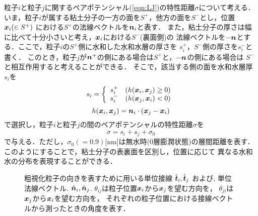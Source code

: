 粒子$i$と粒子$j$に関するペアポテンシャル(\ref{eqn:LJ})の特性距離$\sigma$について考える．
いま，粒子$i$が属する粘土分子の一方の面を$S^+$，他方の面を$S^-$とし，位置$\mbox{\boldmath $x$}_i(\in S^+)$
における$S^+$の法線ベクトルを$\mbox{\boldmath $n$}_i$と表す．
また，粘土分子の厚さは幅に比べて十分小さいと考え，$\mbox{\boldmath $x$}_i$における$S^-$(裏面側)の
法線ベクトルを$-\mbox{\boldmath $n$}$とする．ここで，粒子$i$の$S^+$側に水和した水和水層の厚さを
$s_i^+$，$S^-$側の厚さを$s_i^-$と書く．
このとき，粒子$j$が$\mbox{\boldmath $n$}^+$の側にある場合は$S^+$と，$-\mbox{\boldmath $n$}$の側にある場合は
$S^-$と相互作用すると考えることができる．
そこで，該当する側の面を水和水層厚$s_i$を
\begin{equation}
	s_i=\left\{
	\begin{array}{cc}
		s_i^+ & (h(\mbox{\boldmath $x$}_i,\mbox{\boldmath $x$}_j) \ge 0)\\
		s_i^- & (h(\mbox{\boldmath $x$}_j,\mbox{\boldmath $x$}_i) <0)
	\end{array}
	\right.
	\label{eqn:si_switch}
\end{equation}
\begin{equation}
	h(\mbox{\boldmath $x$}_i,\mbox{\boldmath $x$}_j) =\mbox{\boldmath $n$}_i\cdot \left(\mbox{\boldmath $x$}_j-\mbox{\boldmath $x$}_i\right)
	\label{eqn:h_sgn}
\end{equation}
で選択し，粒子$i$と粒子$j$の間のペアポテンシャルの特性距離$\sigma$を
\begin{equation}
	\sigma=s_i+s_j+\sigma_0
	\label{eqn:sig_ij}
\end{equation}
で与える．ただし，$\sigma_0(=0.9)$[nm]は無水時(0層膨潤状態)の層間距離を表す．
このようにすることで，粘土分子の表裏面を区別し，位置に応じて
異なる水和水の分布を表現することができる．
\begin{figure}[h]
	\begin{center}
	\end{center}
	\caption{
		粗視化粒子の向きを表すために用いる単位接線
		$\hat{\mbox{\boldmath $t$}}_i,\hat{\mbox{\boldmath $t$}}_j$
		および, 単位法線ベクトル.
		$\hat{\mbox{\boldmath $n$}}_i,\hat{\mbox{\boldmath $n$}}_j$. 
		$\theta_{ij}$は粒子位置$\mbox{\boldmath $x$}_i$から$\mbox{\boldmath $x$}_j$を望む方向を，
		$\theta_{ji}$は$\mbox{\boldmath $x$}_j$から$\mbox{\boldmath $x$}_i$を望む方向を，
		それぞれの粒子位置における接線ベクトルから測ったときの角度を表す．
	} 
	\label{fig:fig9}
\end{figure}
